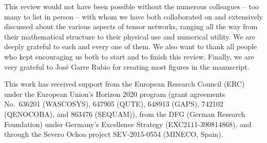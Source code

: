 \documentclass[rmp,aps,reprint,superscriptaddress,nobalancelastpage]{revtex4-1}
\let\endignorethis\relax
\def\TOCstart{\addtocontents{toc}{\endignorethis}}
\begin{document}
\TOCstart
\begin{acknowledgments}
    This review would not have been possible without the numerous colleagues  -- too many to list in person -- with whom we have both
    collaborated on and extensively discussed about the various aspects of tensor networks, ranging all the way from their mathematical structure to their physical use and numerical utility.  We are deeply grateful to each and every one of them.
    We also want to thank all people who kept encouraging us both to start and to finish this review.
    Finally, we are very grateful to  Jos\'e Garre Rubio for creating most figures in the manuscript.

    \vspace{0.5cm}

    This work has received support from the European Research Council (ERC) under the European Union’s Horizon 2020 program (grant agreements No.\  636201 (WASCOSYS),  647905 (QUTE),  648913 (GAPS),   742102 (QENOCOBA),  and 863476 (SEQUAM)), from the DFG (German Research Foundation) under Germany’s Excellence Strategy (EXC2111-390814868), and through the Severo Ochoa project SEV-2015-0554 (MINECO, Spain).
\end{acknowledgments}
\end{document}
